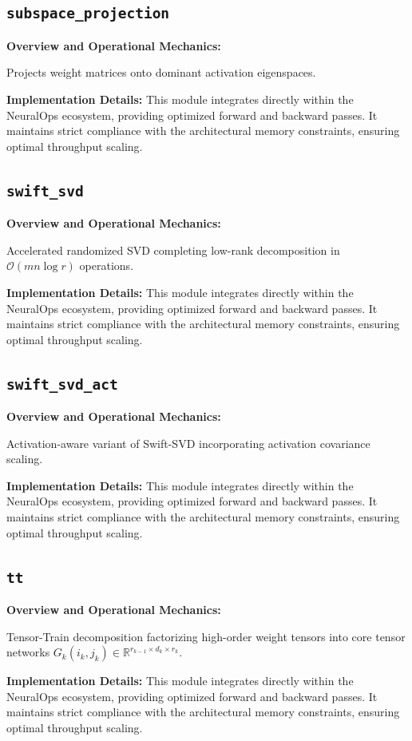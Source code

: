 \documentclass[10pt,twocolumn,letterpaper]{article}
\begin{document}
\subsection{\texttt{subspace\_projection}}
\textbf{Overview and Operational Mechanics:}

Projects weight matrices onto dominant activation eigenspaces.

\textbf{Implementation Details:}
This module integrates directly within the NeuralOps ecosystem, providing optimized forward and backward passes. It maintains strict compliance with the architectural memory constraints, ensuring optimal throughput scaling.

\subsection{\texttt{swift\_svd}}
\textbf{Overview and Operational Mechanics:}

Accelerated randomized SVD completing low-rank decomposition in $\mathcal{O}(m n \log r)$ operations.

\textbf{Implementation Details:}
This module integrates directly within the NeuralOps ecosystem, providing optimized forward and backward passes. It maintains strict compliance with the architectural memory constraints, ensuring optimal throughput scaling.

\subsection{\texttt{swift\_svd\_act}}
\textbf{Overview and Operational Mechanics:}

Activation-aware variant of Swift-SVD incorporating activation covariance scaling.

\textbf{Implementation Details:}
This module integrates directly within the NeuralOps ecosystem, providing optimized forward and backward passes. It maintains strict compliance with the architectural memory constraints, ensuring optimal throughput scaling.

\subsection{\texttt{tt}}
\textbf{Overview and Operational Mechanics:}

Tensor-Train decomposition factorizing high-order weight tensors into core tensor networks $G_k(i_k, j_k) \in \mathbb{R}^{r_{k-1} \times d_k \times r_k}$.

\textbf{Implementation Details:}
This module integrates directly within the NeuralOps ecosystem, providing optimized forward and backward passes. It maintains strict compliance with the architectural memory constraints, ensuring optimal throughput scaling.
\end{document}
